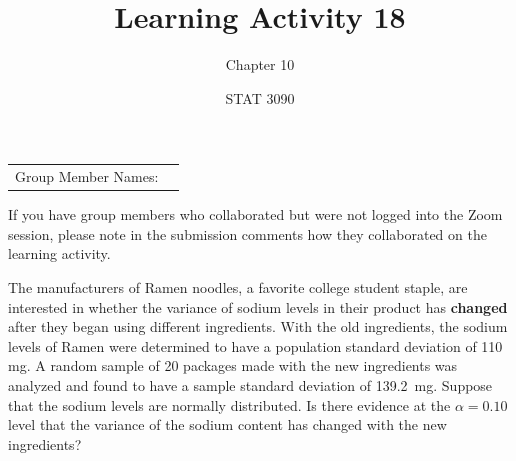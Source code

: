 \documentclass[noanswers]{exam}
\title{Learning Activity 18}
\author{Chapter 10}
\date{STAT 3090}
\begin{document}
\noindent\begin{tabular}{@{}p{1.4in}p{5.2in}@{}}
Group Member Names: & \hrulefill
\end{tabular}

\vspace{1mm}
\noindent If you have group members who collaborated but were not logged into the Zoom session, please note in the submission comments how they collaborated on the learning activity.

\vspace{5mm}

\noindent The manufacturers of Ramen noodles, a favorite college student staple, are interested in whether the variance of sodium levels in their product has \textbf{changed} after they began using different ingredients. With the old ingredients, the sodium levels of Ramen were determined to have a population standard deviation of 110 mg. A random sample of 20 packages made with the new ingredients was analyzed and found to have a sample standard deviation of 139.2~mg. Suppose that the sodium levels are normally distributed. Is there evidence at the $\alpha=0.10$ level that the variance of the sodium content has changed with the new ingredients?

\vspace{3mm}
\end{document}
